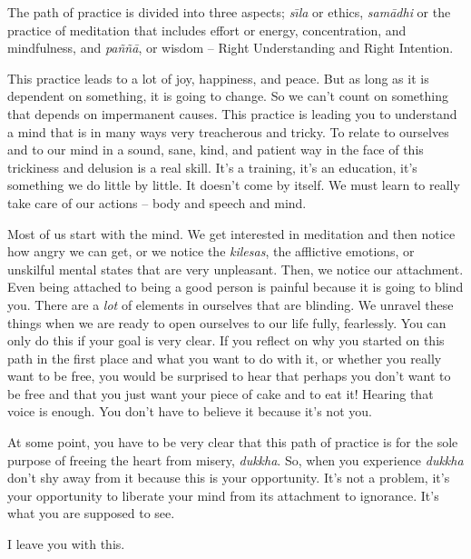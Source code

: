 The path of practice is divided into three aspects; \textit{s\={\i}la} or ethics, \textit{sam\=adhi} or the practice of meditation that includes effort or energy, concentration, and mindfulness, and \textit{pa\~n\~n\=a}, or wisdom -- Right Understanding and Right Intention.

This practice leads to a lot of joy, happiness, and peace. But as long as it is dependent on something, it is going to change. So we can't count on something that depends on impermanent causes. This practice is leading you to understand a mind that is in many ways very treacherous and tricky. To relate to ourselves and to our mind in a sound, sane, kind, and patient way in the face of this trickiness and delusion is a real skill. It's a training, it's an education, it's something we do little by little. It doesn't come by itself. We must learn to really take care of our actions -- body and speech and mind.

Most of us start with the mind. We get interested in meditation and then notice how angry we can get, or we notice the \textit{kilesas}, the afflictive emotions, or unskilful mental states that are very unpleasant. Then, we notice our attachment. Even being attached to being a good person is painful because it is going to blind you. There are a \textit{lot} of elements in ourselves that are blinding. We unravel these things when we are ready to open ourselves to our life fully, fearlessly. You can only do this if your goal is very clear. If you reflect on why you started on this path in the first place and what you want to do with it, or whether you really want to be free, you would be surprised to hear that perhaps you don't want to be free and that you just want your piece of cake and to eat it! Hearing that voice is enough. You don't have to believe it because it's not you. 

At some point, you have to be very clear that this path of practice is for the sole purpose of freeing the heart from misery, \textit{dukkha}. So, when you experience \textit{dukkha} don't shy away from it because this is your opportunity. It's not a problem, it's your opportunity to liberate your mind from its attachment to ignorance. It's what you are supposed to see. 

I leave you with this.
